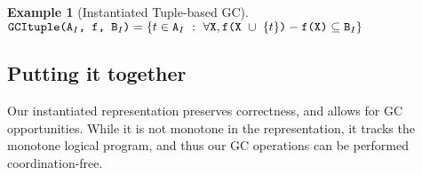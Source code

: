 \documentclass[10pt]{proc}
\numberwithin{equation}{section}
\newtheorem{example}{Example}[section]
\renewcommand{\tt}[1]{\ifmmode\text{\texttt{#1}}\else\texttt{#1}\fi}
\begin{document}
\begin{example}[Instantiated Tuple-based GC]
$\tt{GCItuple(A$_I$, f, B$_I$)} = \{t \in \tt{A}_I ~:~ \forall \tt{X}, \tt{f(X $\cup$ $\{t\}$)} - \tt{f(X)} \subseteq \tt{B}_I\}$
\end{example}

\subsection{Putting it together}
Our instantiated representation preserves correctness, and allows for GC opportunities.
While it is not monotone in the representation, it tracks the monotone logical program, and thus our GC operations can be performed coordination-free.

\newpage
\balance





\end{document}
